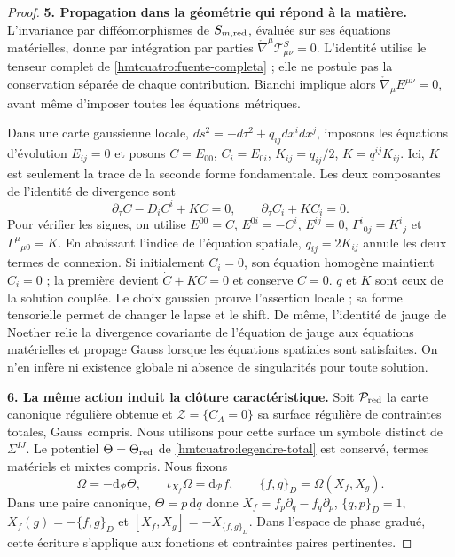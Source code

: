 \begin{proof}
\par\medskip\noindent\textbf{5. Propagation dans la géométrie qui répond à la matière.}\quad
L’invariance par difféomorphismes de \(S_{m,\rm red}\), évaluée sur ses équations matérielles, donne par intégration par parties \(\mathring\nabla^\mu\mathcal T^S_{\mu\nu}=0\). L’identité utilise le tenseur complet de \eqref{hmtcuatro:fuente-completa} ; elle ne postule pas la conservation séparée de chaque contribution. Bianchi implique alors \(\mathring\nabla_\mu E^{\mu\nu}=0\), avant même d’imposer toutes les équations métriques.

Dans une carte gaussienne locale, \(ds^2=-d\tau^2+q_{ij}dx^idx^j\), imposons les équations d’évolution \(E_{ij}=0\) et posons \(C=E_{00}\), \(C_i=E_{0i}\), \(K_{ij}=\dot q_{ij}/2\), \(K=q^{ij}K_{ij}\). Ici, \(K\) est seulement la trace de la seconde forme fondamentale. Les deux composantes de l’identité de divergence sont
\begin{equation}
 \partial_\tau C-D_iC^i+KC=0,\qquad
 \partial_\tau C_i+KC_i=0.
 \label{hmtcuatro:propagacion}
\end{equation}
Pour vérifier les signes, on utilise \(E^{00}=C\), \(E^{0i}=-C^i\), \(E^{ij}=0\), \(\Gamma^i{}_{0j}=K^i{}_j\) et \(\Gamma^\mu{}_{\mu0}=K\). En abaissant l’indice de l’équation spatiale, \(\dot q_{ij}=2K_{ij}\) annule les deux termes de connexion. Si initialement \(C_i=0\), son équation homogène maintient \(C_i=0\) ; la première devient \(\dot C+KC=0\) et conserve \(C=0\). \(q\) et \(K\) sont ceux de la solution couplée. Le choix gaussien prouve l’assertion locale ; sa forme tensorielle permet de changer le lapse et le shift. De même, l’identité de jauge de Noether relie la divergence covariante de l’équation de jauge aux équations matérielles et propage Gauss lorsque les équations spatiales sont satisfaites. On n’en infère ni existence globale ni absence de singularités pour toute solution.

\par\medskip\noindent\textbf{6. La même action induit la clôture caractéristique.}\quad
Soit \(\mathcal P_{\rm red}\) la carte canonique régulière obtenue et \(\mathcal Z=\{C_A=0\}\) sa surface régulière de contraintes totales, Gauss compris. Nous utilisons pour cette surface un symbole distinct de \(\Sigma^{IJ}\). Le potentiel \(\Theta=\Theta_{\rm red}\) de \eqref{hmtcuatro:legendre-total} est conservé, termes matériels et mixtes compris. Nous fixons
\begin{equation}
 \Omega=-\mathrm d_{\mathcal P}\Theta,\qquad
 \iota_{X_f}\Omega=\mathrm d_{\mathcal P}f,\qquad
 \{f,g\}_D=\Omega(X_f,X_g).
 \label{hmtcuatro:convenciones-simpecticas}
\end{equation}
Dans une paire canonique, \(\Theta=p\,\mathrm dq\) donne \(X_f=f_p\partial_q-f_q\partial_p\), \(\{q,p\}_D=1\), \(X_f(g)=-\{f,g\}_D\) et \([X_f,X_g]=-X_{\{f,g\}_D}\). Dans l’espace de phase gradué, cette écriture s’applique aux fonctions et contraintes paires pertinentes.


\end{proof}
